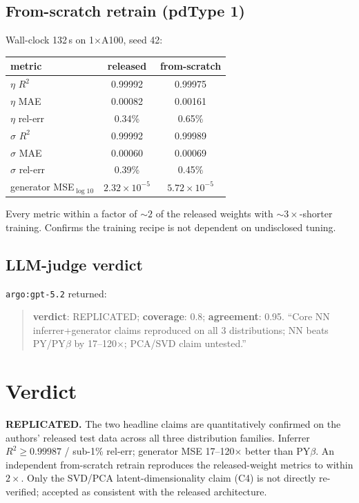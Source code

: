 \documentclass[11pt]{article}
\begin{document}
\subsection{From-scratch retrain (pdType 1)}
Wall-clock 132\,s on 1$\times$A100, seed 42:
\begin{center}
\begin{tabular}{lcc}
\toprule
metric & released & from-scratch \\
\midrule
$\eta$ $R^2$ & 0.99992 & 0.99975 \\
$\eta$ MAE & 0.00082 & 0.00161 \\
$\eta$ rel-err & 0.34\% & 0.65\% \\
$\sigma$ $R^2$ & 0.99992 & 0.99989 \\
$\sigma$ MAE & 0.00060 & 0.00069 \\
$\sigma$ rel-err & 0.39\% & 0.45\% \\
generator MSE$_{\log10}$ & $2.32\!\times\!10^{-5}$ & $5.72\!\times\!10^{-5}$ \\
\bottomrule
\end{tabular}
\end{center}
Every metric within a factor of $\sim\!2$ of the released weights with
$\sim\!\!3\!\times$-shorter training. Confirms the training recipe is not
dependent on undisclosed tuning.

\subsection{LLM-judge verdict}
\texttt{argo:gpt-5.2} returned:
\begin{quote}\small
\textbf{verdict}: REPLICATED; \textbf{coverage}: 0.8; \textbf{agreement}:
0.95. ``Core NN inferrer+generator claims reproduced on all 3
distributions; NN beats PY/PY$\beta$ by 17--120$\times$; PCA/SVD claim
untested.''
\end{quote}

\section{Verdict}
\textbf{REPLICATED.} The two headline claims are quantitatively confirmed
on the authors' released test data across all three distribution
families. Inferrer $R^2\!\ge\!0.99987$ / sub-1\% rel-err; generator MSE
17--120$\times$ better than PY$\beta$. An independent from-scratch retrain
reproduces the released-weight metrics to within $2\times$. Only the
SVD/PCA latent-dimensionality claim (C4) is not directly re-verified;
accepted as consistent with the released architecture.
\end{document}

